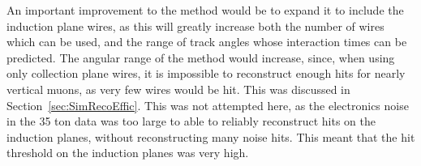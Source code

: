 An important improvement to the method would be to expand it to include the induction plane wires, as this will greatly increase both the number of wires which can be used, and the range of track angles whose interaction times can be predicted. The angular range of the method would increase, since, when using only collection plane wires, it is impossible to reconstruct enough hits for nearly vertical muons, as very few wires would be hit. This was discussed in Section~\ref{sec:SimRecoEffic}. This was not attempted here, as the electronics noise in the 35 ton data was too large to able to reliably reconstruct hits on the induction planes, without reconstructing many noise hits. This meant that the hit threshold on the induction planes was very high. \\

